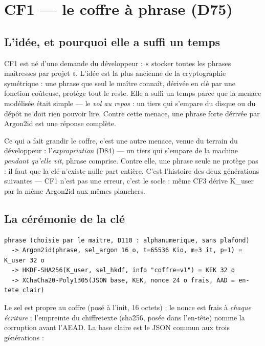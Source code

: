 \section{CF1 — le coffre à phrase (D75)}\label{sec:cf1}

\subsection{L'idée, et pourquoi elle a suffi un temps}

CF1 est né d'une demande du développeur : « stocker toutes les phrases maîtresses par
projet ». L'idée est la plus ancienne de la cryptographie symétrique : une phrase que
seul le maître connaît, dérivée en clé par une fonction coûteuse, protège tout le reste.
Elle a suffi un temps parce que la menace modélisée était simple — le \emph{vol au
repos} : un tiers qui s'empare du disque ou du dépôt ne doit rien pouvoir lire. Contre
cette menace, une phrase forte dérivée par Argon2id est une réponse complète.

Ce qui a fait grandir le coffre, c'est une autre menace, venue du terrain du
développeur : l'\emph{expropriation} (D84) — un tiers qui s'empare de la machine
\emph{pendant qu'elle vit}, phrase comprise. Contre elle, une phrase seule ne protège
pas : il faut que la clé n'existe nulle part entière. C'est l'histoire des deux
générations suivantes — CF1 n'est pas une erreur, c'est le socle : même CF3 dérive
K\_user par la même Argon2id aux mêmes planchers.

\subsection{La cérémonie de la clé}

\begin{lstlisting}
phrase (choisie par le maitre, D110 : alphanumerique, sans plafond)
  -> Argon2id(phrase, sel_argon 16 o, t=65536 Kio, m=3 it, p=1) = K_user 32 o
  -> HKDF-SHA256(K_user, sel_hkdf, info "coffre=v1") = KEK 32 o
  -> XChaCha20-Poly1305(JSON base, KEK, nonce 24 o frais, AAD = en-tete clair)
\end{lstlisting}

Le sel est propre au coffre (posé à l'init, 16 octets) ; le nonce est frais à
\emph{chaque écriture} ; l'empreinte du chiffretexte (sha256, posée dans l'en-tête)
nomme la corruption avant l'AEAD. La base claire est le JSON commun aux trois
générations :

